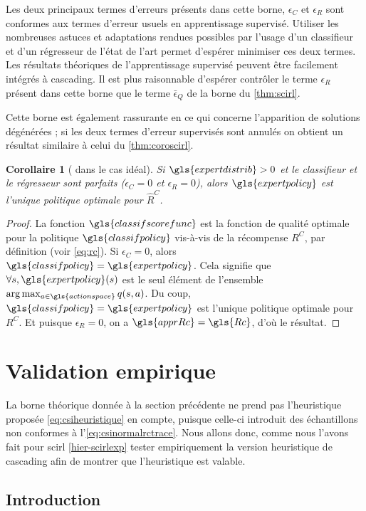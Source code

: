 \documentclass[frenchb,a4paper,justified,notoc]{tufte-book}
\newcommand{\Rc}{\gls{Rc}}
\newcommand{\apprRc}{\gls{apprRc}}
\newcommand{\classifscorefunc}{\gls{classifscorefunc}}
\newcommand{\expertpolicy}{\gls{expertpolicy}}
\newcommand{\classifpolicy}{\gls{classifpolicy}}
\newcommand{\actionspace}{\gls{actionspace}}
\newcommand{\expertdistrib}{\gls{expertdistrib}}
\newtheorem{corollary}{Corollaire}
\begin{document}
Les deux principaux termes d'erreurs présents dans cette borne, $\epsilon_C$ et $\epsilon_R$ sont conformes aux termes d'erreur usuels en apprentissage supervisé. Utiliser les nombreuses astuces et adaptations rendues possibles par l'usage d'un classifieur et d'un régresseur de l'état de l'art permet d'espérer minimiser ces deux termes. Les résultats théoriques de l'apprentissage supervisé peuvent être facilement intégrés à \gls{cascading}. Il est plus raisonnable d'espérer contrôler le terme $\epsilon_R$ présent dans cette borne que le terme $\bar\epsilon_Q$ de la borne du \autoref{thm:scirl}.

Cette borne est également rassurante en ce qui concerne l'apparition de solutions dégénérées ; si les deux termes d'erreur supervisés sont annulés on obtient un résultat similaire à celui du \autoref{thm:coroscirl}.
\begin{corollary}[ dans le cas idéal]
  Si $\expertdistrib>0$ et le classifieur et le régresseur sont parfaits ($\epsilon_C = 0$ et $\epsilon_R = 0$), alors $\expertpolicy$ est l'\emph{unique} politique optimale pour $\hat R^C$.
\label{thm:cor}
\end{corollary}

\begin{proof}
  La fonction $\classifscorefunc$ est la fonction de qualité optimale pour la politique $\classifpolicy$ vis-à-vis de la récompense $R^C$, par définition (voir \autoref{eq:rc}). Si $\epsilon_C = 0$, alors $\classifpolicy = \expertpolicy$. Cela signifie que $\forall s, \expertpolicy(s)$ est le seul élément de l'ensemble $\arg\max_{a\in \actionspace}q(s,a)$. Du coup, $\classifpolicy = \expertpolicy$ est l'unique politique optimale pour $R^C$.
  Et puisque $\epsilon_R = 0$, on a $\apprRc = \Rc$, d'où le résultat.
\end{proof}
\section{Validation empirique}
\label{sec-6-3}
\label{hier-csiempirique}

La borne théorique donnée à la section précédente ne prend pas l'heuristique proposée \autoref{eq:csiheuristique} en compte, puisque celle-ci introduit des échantillons non conformes à l'\autoref{eq:csinormalrctrace}. Nous allons donc, comme nous l'avons fait pour \gls{scirl} \autoref{hier-scirlexp} tester empiriquement la version heuristique de \gls{cascading} afin de montrer que l'heuristique est valable.
\subsection{Introduction}
\label{sec-6-3-1}
\end{document}
